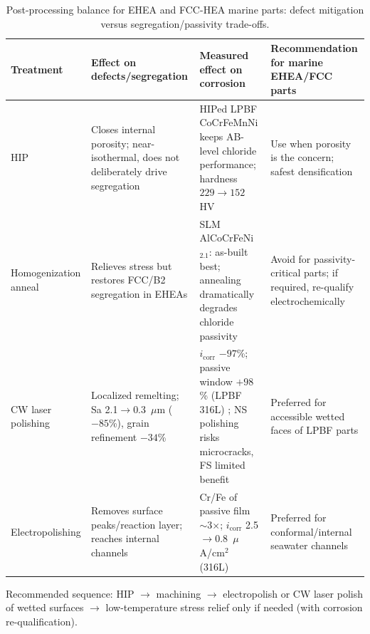 \begin{table}[t]
\centering
\caption{Post-processing balance for EHEA and FCC-HEA marine parts: defect mitigation versus segregation/passivity trade-offs.}
\label{tab:postprocess}
\footnotesize
\begin{tabularx}{\textwidth}{@{}lXXX@{}}
\toprule
Treatment & Effect on defects/segregation & Measured effect on corrosion & Recommendation for marine EHEA/FCC parts \\
\midrule
HIP & Closes internal porosity; near-isothermal, does not deliberately drive segregation & HIPed LPBF CoCrFeMnNi keeps AB-level chloride performance; hardness $229\!\to\!152$ HV \cite{lpbf_cantor_2024} & Use when porosity is the concern; safest densification \\
Homogenization anneal & Relieves stress but restores FCC/B2 segregation in EHEAs & SLM AlCoCrFeNi$_{2.1}$: as-built best; annealing dramatically degrades chloride passivity \cite{slm_ehea_2025} & Avoid for passivity-critical parts; if required, re-qualify electrochemically \\
CW laser polishing & Localized remelting; Sa 2.1$\to$0.3~$\mu$m ($-85$\%), grain refinement $-34$\% & $i_{\mathrm{corr}}$ $-97$\%; passive window $+98$\% (LPBF 316L) \cite{laserpolish2026}; NS polishing risks microcracks, FS limited benefit \cite{laserpolish2023} & Preferred for accessible wetted faces of LPBF parts \\
Electropolishing & Removes surface peaks/reaction layer; reaches internal channels & Cr/Fe of passive film $\sim$3$\times$; $i_{\mathrm{corr}}$ 2.5$\to$0.8~$\mu$A/cm$^2$ (316L) \cite{ep2014} & Preferred for conformal/internal seawater channels \\
\bottomrule
\end{tabularx}

\vspace{4pt}
\footnotesize Recommended sequence: HIP $\rightarrow$ machining $\rightarrow$ electropolish or CW laser polish of wetted surfaces $\rightarrow$ low-temperature stress relief only if needed (with corrosion re-qualification).

\end{table}
